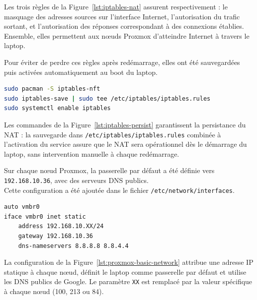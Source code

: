 \par Les trois règles de la Figure~\ref{lst:iptables-nat} assurent respectivement : le masquage des adresses sources sur l'interface Internet, l'autorisation du trafic sortant, et l'autorisation des réponses correspondant à des connexions établies. Ensemble, elles permettent aux nœuds Proxmox d'atteindre Internet à travers le laptop.\\

\par Pour éviter de perdre ces règles après redémarrage, elles ont été sauvegardées puis activées automatiquement au boot du laptop.\\

\begin{lstlisting}[style=sonacode,language=bash,caption={Persistance des règles iptables},label={lst:iptables-persist}]
sudo pacman -S iptables-nft
sudo iptables-save | sudo tee /etc/iptables/iptables.rules
sudo systemctl enable iptables
\end{lstlisting}

\par Les commandes de la Figure~\ref{lst:iptables-persist} garantissent la persistance du NAT : la sauvegarde dans \texttt{/etc/iptables/iptables.rules} combinée à l'activation du service assure que le NAT sera opérationnel dès le démarrage du laptop, sans intervention manuelle à chaque redémarrage.\\

\par Sur chaque nœud Proxmox, la passerelle par défaut a été définie vers \texttt{192.168.10.36}, avec des serveurs DNS publics. \\Cette configuration a été ajoutée dans le fichier \texttt{/etc/network/interfaces}.\\

\begin{lstlisting}[style=sonacode,language={},caption={Configuration réseau de base d'un nœud Proxmox},label={lst:proxmox-basic-network}]
auto vmbr0
iface vmbr0 inet static
    address 192.168.10.XX/24
    gateway 192.168.10.36
    dns-nameservers 8.8.8.8 8.8.4.4
\end{lstlisting}

\par La configuration de la Figure~\ref{lst:proxmox-basic-network} attribue une adresse IP statique à chaque nœud, définit le laptop comme passerelle par défaut et utilise les DNS publics de Google. Le paramètre \texttt{XX} est remplacé par la valeur spécifique à chaque nœud (100, 213 ou 84).\\

